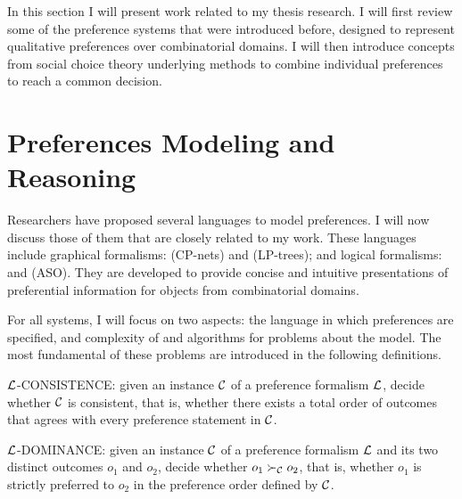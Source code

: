 
In this section I will present work related to my thesis research.
I will first review some of the preference
systems that were introduced before, designed to represent
qualitative preferences over combinatorial domains. 
I will then introduce concepts
from social choice theory underlying methods to
combine individual preferences to reach a common decision.

\section{Preferences Modeling and Reasoning \label{sec:pref_reasoning}}
Researchers have proposed several languages to model preferences.
I will now discuss those of them that are closely related
to my work.
These languages include graphical formalisms:
 (CP-nets) and
 (LP-trees);
and logical formalisms:
 and
 (ASO).
They are developed to provide concise and intuitive
presentations of preferential information for objects from
combinatorial domains.

For all systems, I will focus on two aspects:
the language in which preferences are specified,
and complexity of and algorithms for
problems about the model.
The most fundamental of these problems are introduced
in the following definitions.

\begin{definition}
\label{def:con}
  $\mathcal{L}$-CONSISTENCE: given an instance $\mathcal{C}$ of a preference
	formalism $\mathcal{L}$, decide whether $\mathcal{C}$ is consistent, that is,
  whether there exists a total order of outcomes that agrees with every
	preference statement in $\mathcal{C}$.
\end{definition}

\begin{definition}
\label{def:dom}
  $\mathcal{L}$-DOMINANCE: given an instance $\mathcal{C}$ of a preference
	formalism $\mathcal{L}$ and its two distinct outcomes
  $o_1$ and $o_2$, decide whether $o_1 \succ_{\mathcal{C}} o_2$, that is,
  whether $o_1$ is strictly preferred to $o_2$ in 
	the preference order defined by $\mathcal{C}$.
\end{definition}

